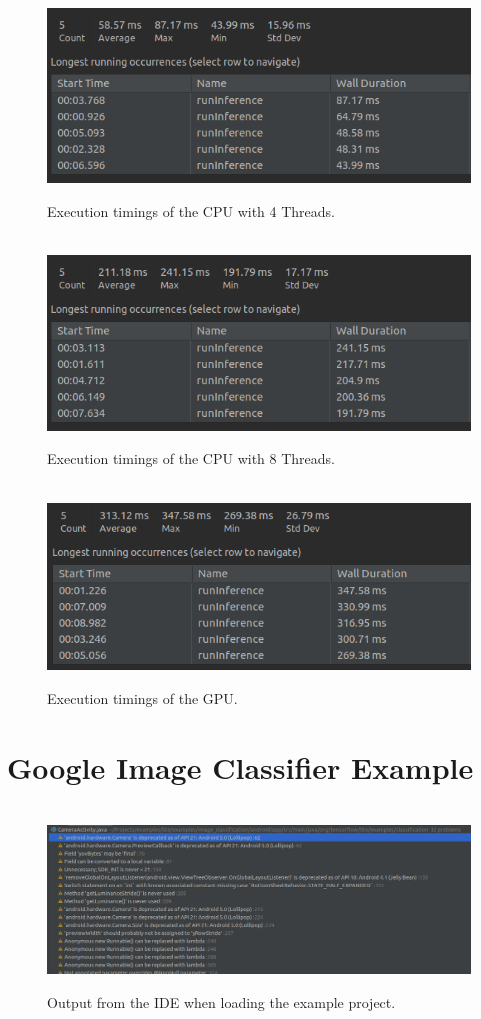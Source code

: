 \documentclass[12pt,a4paper]{report}
\begin{document}
\begin{figure}[h]\
    \includegraphics[width=\textwidth]{CPU4_Time.png}
    \caption{Execution timings of the CPU with 4 Threads.}
    \label{fig:cpu4}
\end{figure}

\begin{figure}[h]\
    \includegraphics[width=\textwidth]{CPU8_Time.png}
    \caption{Execution timings of the CPU with 8 Threads.}
    \label{fig:cpu8}
\end{figure}

\begin{figure}[h]\
    \includegraphics[width=\textwidth]{GPU_Time.png}
    \caption{Execution timings of the GPU.}
    \label{fig:gpu}
\end{figure}

\clearpage

\section{Google Image Classifier Example}

\begin{figure}[h]\
    \includegraphics[width=\textwidth]{Depracated.png}
    \caption{Output from the IDE when loading the example project.}
    \label{fig:depracated}
\end{figure}

\break
\end{document}

